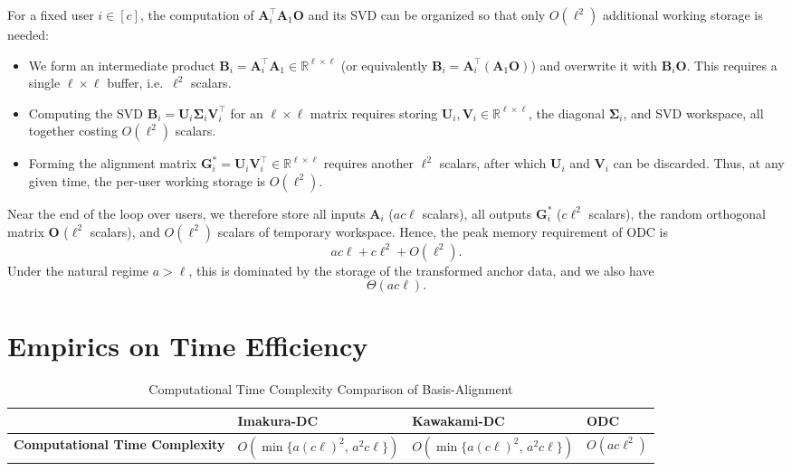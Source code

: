 \documentclass[final,3p,times]{elsarticle}
\theoremstyle{plain}
\newcommand{\matr}[1]{\bm{#1}}        %
\begin{document}
For a fixed user $i \in [c]$, the computation of
\(
\matr{A}_i^\top \matr{A}_1 \matr{O}
\)
and its SVD can be organized so that only $O(\ell^{2})$ additional working storage is needed:
\begin{itemize}
  \item We form an intermediate product $\matr{B}_i = \matr{A}_i^\top \matr{A}_1 \in \mathbb{R}^{\ell \times \ell}$ (or equivalently $\matr{B}_i = \matr{A}_i^\top (\matr{A}_1 \matr{O})$) and overwrite it with $\matr{B}_i \matr{O}$. This requires a single $\ell \times \ell$ buffer, i.e.\ $\ell^{2}$ scalars.
  \item Computing the SVD $\matr{B}_i = \matr{U}_i \matr{\Sigma}_i \matr{V}_i^\top$ for an $\ell \times \ell$ matrix requires storing $\matr{U}_i, \matr{V}_i \in \mathbb{R}^{\ell \times \ell}$, the diagonal $\matr{\Sigma}_i$, and SVD workspace, all together costing $O(\ell^{2})$ scalars.
  \item Forming the alignment matrix $\matr{G}_i^* = \matr{U}_i \matr{V}_i^\top \in \mathbb{R}^{\ell \times \ell}$ requires another $\ell^{2}$ scalars, after which $\matr{U}_i$ and $\matr{V}_i$ can be discarded. Thus, at any given time, the per-user working storage is $O(\ell^{2})$.
\end{itemize}
Near the end of the loop over users, we therefore store all inputs $\matr{A}_i$ ($a c \ell$ scalars), all outputs $\matr{G}_i^*$ ($c \ell^{2}$ scalars), the random orthogonal matrix $\matr{O}$ ($\ell^{2}$ scalars), and $O(\ell^{2})$ scalars of temporary workspace. Hence, the peak memory requirement of ODC is
\begin{equation}
a c \ell + c \ell^{2} + O(\ell^{2}).
\end{equation}
Under the natural regime $a > \ell$, this is dominated by the storage of the transformed anchor data, and we also have
\begin{equation}
\Theta(a c \ell).
\end{equation}







\section{Empirics on Time Efficiency}
\label{sec:efficiency-eval}

\begin{table}[t]
    \centering
    \caption{Computational Time Complexity Comparison of Basis-Alignment}
    \begin{tabular}{@{}llll@{}}
        \toprule
        & \textbf{Imakura-DC} & \textbf{Kawakami-DC} & \textbf{ODC}\\
        \midrule
        \textbf{Computational Time Complexity}  & \( O\left(\min\{a(c\ell)^2,\, a^2c\ell\}\right) \) & \( O\left(\min\{a(c\ell)^2,\, a^2c\ell\}\right) \) & \( O(ac\ell^2) \) \\
        \bottomrule
    \end{tabular}
    \label{tab: bigo}
\end{table}
\end{document}
